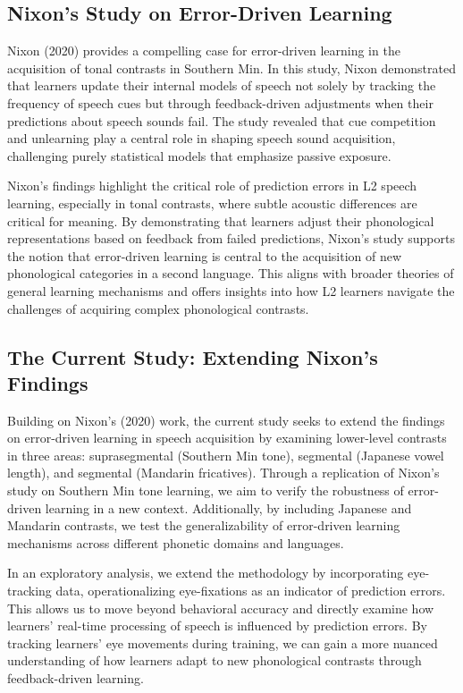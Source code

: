 \subsection{Nixon’s Study on Error-Driven Learning}

Nixon (2020) provides a compelling case for error-driven learning in the acquisition of tonal contrasts in Southern Min. In this study, Nixon demonstrated that learners update their internal models of speech not solely by tracking the frequency of speech cues but through feedback-driven adjustments when their predictions about speech sounds fail. The study revealed that cue competition and unlearning play a central role in shaping speech sound acquisition, challenging purely statistical models that emphasize passive exposure.

Nixon's findings highlight the critical role of prediction errors in L2 speech learning, especially in tonal contrasts, where subtle acoustic differences are critical for meaning. By demonstrating that learners adjust their phonological representations based on feedback from failed predictions, Nixon's study supports the notion that error-driven learning is central to the acquisition of new phonological categories in a second language. This aligns with broader theories of general learning mechanisms and offers insights into how L2 learners navigate the challenges of acquiring complex phonological contrasts.

\subsection{The Current Study: Extending Nixon’s Findings}

Building on Nixon’s (2020) work, the current study seeks to extend the findings on error-driven learning in speech acquisition by examining lower-level contrasts in three areas: suprasegmental (Southern Min tone), segmental (Japanese vowel length), and segmental (Mandarin fricatives). Through a replication of Nixon’s study on Southern Min tone learning, we aim to verify the robustness of error-driven learning in a new context. Additionally, by including Japanese and Mandarin contrasts, we test the generalizability of error-driven learning mechanisms across different phonetic domains and languages.

In an exploratory analysis, we extend the methodology by incorporating eye-tracking data, operationalizing eye-fixations as an indicator of prediction errors. This allows us to move beyond behavioral accuracy and directly examine how learners’ real-time processing of speech is influenced by prediction errors. By tracking learners’ eye movements during training, we can gain a more nuanced understanding of how learners adapt to new phonological contrasts through feedback-driven learning.












